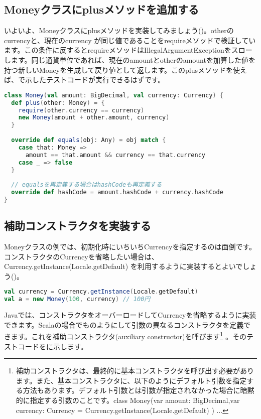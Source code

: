 \subsection{Moneyクラスにplusメソッドを追加する}
いよいよ、Moneyクラスにplusメソッドを実装してみましょう()。otherのcurrencyと、現在のcurrency が同じ値であることをrequireメソッドで検証しています。この条件に反するとrequireメソッドはIllegalArgumentExceptionをスローします。同じ通貨単位であれば、現在のamountとotherのamountを加算した値を持つ新しいMoneyを生成して戻り値として返します。このplusメソッドを使えば、で示したテストコードが実行できるはずです。 

\begin{lstlisting}[language=scala, label=src:money_plus, caption=plusメソッドを実装したMoneyクラス]
class Money(val amount: BigDecimal, val currency: Currency) {
  def plus(other: Money) = {
    require(other.currency == currency)
    new Money(amount + other.amount, currency)
  }
   
  override def equals(obj: Any) = obj match {
    case that: Money =>
      amount == that.amount && currency == that.currency
    case _ => false
  }
   
  // equalsを再定義する場合はhashCodeも再定義する
  override def hashCode = amount.hashCode + currency.hashCode
} 
\end{lstlisting}

\subsection{補助コンストラクタを実装する}
Moneyクラスの例では、初期化時にいちいちCurrencyを指定するのは面倒です。コンストラクタのCurrencyを省略したい場合は、Currency.getInstance(Locale.getDefault) を利用するように実装するとよいでしょう()。 

\begin{lstlisting}[language=scala, label=src:locale_default, caption=ほとんどの場合で次のようにして円の通貨単位を扱える]
val currency = Currency.getInstance(Locale.getDefault)
val a = new Money(100, currency) // 100円 
\end{lstlisting}

Javaでは、コンストラクタをオーバーロードしてCurrencyを省略するように実装できます。Scalaの場合でものようにして引数の異なるコンストラクタを定義できます。これを補助コンストラクタ(auxiliary constructor)を呼びます\footnote{補助コンストラクタは、最終的に基本コンストラクタを呼び出す必要があります。また、基本コンストラクタに、以下のようにデフォルト引数を指定する方法もあります。デフォルト引数とは引数が指定されなかった場合に暗黙的に指定する引数のことです。class Money(var amount: BigDecimal,var currency: Currency = Currency.getInstance(Locale.getDefault) ) ...} 。そのテストコードをに示します。

